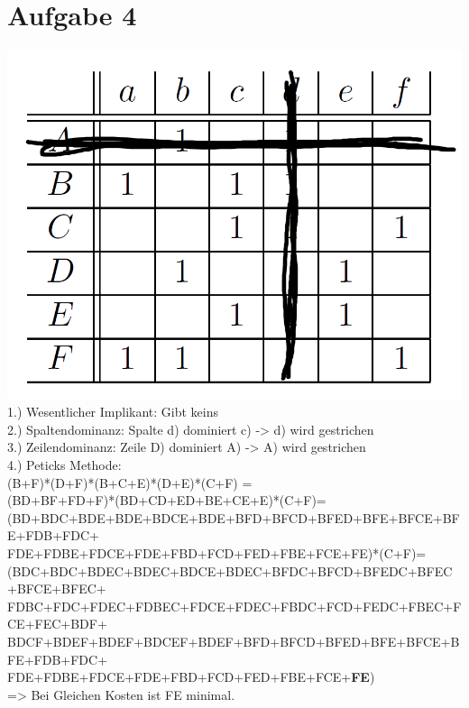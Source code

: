 \documentclass{scrartcl}
\begin{document}
	\section*{Aufgabe 4}
	\includegraphics[width=14cm]{primtafel.png}\\
	1.) Wesentlicher Implikant: Gibt keins\\
	2.) Spaltendominanz: Spalte d) dominiert c) -> d) wird gestrichen\\
	3.) Zeilendominanz: Zeile D) dominiert A) -> A) wird gestrichen\\
	4.) Peticks Methode:\\ 
	(B+F)*(D+F)*(B+C+E)*(D+E)*(C+F) =\\
	(BD+BF+FD+F)*(BD+CD+ED+BE+CE+E)*(C+F)=\\
	(BD+BDC+BDE+BDE+BDCE+BDE+BFD+BFCD+BFED+BFE+BFCE+BFE+FDB+FDC+\\FDE+FDBE+FDCE+FDE+FBD+FCD+FED+FBE+FCE+FE)*(C+F)=\\
	(BDC+BDC+BDEC+BDEC+BDCE+BDEC+BFDC+BFCD+BFEDC+BFEC+BFCE+BFEC+\\FDBC+FDC+FDEC+FDBEC+FDCE+FDEC+FBDC+FCD+FEDC+FBEC+FCE+FEC+BDF+\\BDCF+BDEF+BDEF+BDCEF+BDEF+BFD+BFCD+BFED+BFE+BFCE+BFE+FDB+FDC+\\FDE+FDBE+FDCE+FDE+FBD+FCD+FED+FBE+FCE+\textbf{FE})\\
	=> Bei Gleichen Kosten ist FE minimal.
	
	
\end{document}
